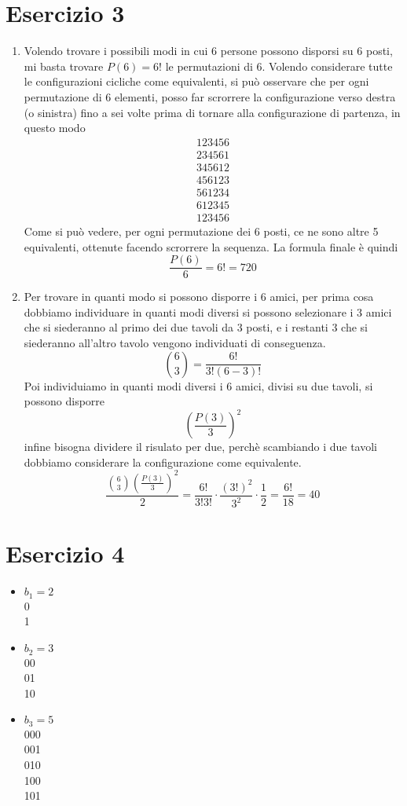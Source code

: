 \documentclass{article}
\begin{document}
\section{Esercizio 3}
\begin{enumerate}
    \item Volendo trovare i possibili modi in cui 6 persone possono disporsi su 6 posti, mi basta trovare \(P(6) = 6!\) le permutazioni di 6. Volendo considerare tutte le configurazioni cicliche come equivalenti, si può osservare che per ogni permutazione di 6 elementi, posso far scrorrere la configurazione verso destra (o sinistra) fino a sei volte prima di tornare alla configurazione di partenza, in questo modo
    \begin{align*}
        123456 \\
        234561 \\
        345612 \\
        456123 \\
        561234 \\
        612345 \\
        123456
    \end{align*}
    Come si può vedere, per ogni permutazione dei 6 posti, ce ne sono altre 5 equivalenti, ottenute facendo scrorrere la sequenza. La formula finale è quindi
    \[\frac{P(6)}{6} = 6! = 720\]
    \item Per trovare in quanti modo si possono disporre i 6 amici, per prima cosa dobbiamo individuare in quanti modi diversi si possono selezionare i 3 amici che si siederanno al primo dei due tavoli da 3 posti, e i restanti 3 che si siederanno all'altro tavolo vengono individuati di conseguenza.
    \[\binom{6}{3} = \frac{6!}{3!(6 - 3)!}\]
    Poi individuiamo in quanti modi diversi i 6 amici, divisi su due tavoli, si possono disporre
    \[\left(\frac{P(3)}{3}\right)^2\]
    infine bisogna dividere il risulato per due, perchè scambiando i due tavoli dobbiamo considerare la configurazione come equivalente.
    \[\frac{\binom{6}{3}\left(\frac{P(3)}{3}\right)^2}{2} = \frac{6!}{3!3!} \cdot \frac{(3!)^2}{3^2} \cdot \frac{1}{2} = \frac{6!}{18} = 40\]
\end{enumerate}

\section{Esercizio 4}
\begin{itemize}
    \item \(b_1 = 2\) \\
    0 \\
    1

    \item \(b_2 = 3\) \\
    00 \\
    01 \\
    10

    \item \(b_3 = 5\) \\
    000 \\
    001 \\
    010 \\
    100 \\
    101
\end{itemize}
\end{document}
